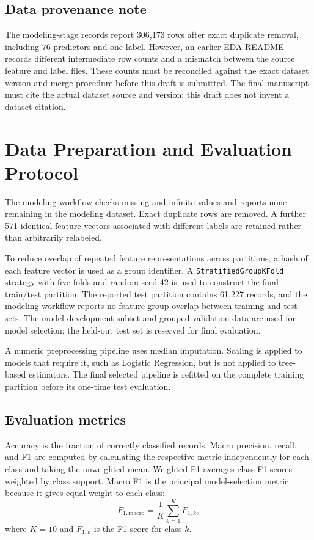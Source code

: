 \documentclass[conference]{IEEEtran}
\begin{document}
\subsection{Data provenance note}
The modeling-stage records report 306,173 rows after exact duplicate removal, including 76 predictors and one label. However, an earlier EDA README records different intermediate row counts and a mismatch between the source feature and label files. These counts must be reconciled against the exact dataset version and merge procedure before this draft is submitted. The final manuscript must cite the actual dataset source and version; this draft does not invent a dataset citation.

\section{Data Preparation and Evaluation Protocol}
The modeling workflow checks missing and infinite values and reports none remaining in the modeling dataset. Exact duplicate rows are removed. A further 571 identical feature vectors associated with different labels are retained rather than arbitrarily relabeled.

To reduce overlap of repeated feature representations across partitions, a hash of each feature vector is used as a group identifier. A \texttt{StratifiedGroupKFold} strategy with five folds and random seed 42 is used to construct the final train/test partition. The reported test partition contains 61,227 records, and the modeling workflow reports no feature-group overlap between training and test sets. The model-development subset and grouped validation data are used for model selection; the held-out test set is reserved for final evaluation.

A numeric preprocessing pipeline uses median imputation. Scaling is applied to models that require it, such as Logistic Regression, but is not applied to tree-based estimators. The final selected pipeline is refitted on the complete training partition before its one-time test evaluation.

\subsection{Evaluation metrics}
Accuracy is the fraction of correctly classified records. Macro precision, recall, and F1 are computed by calculating the respective metric independently for each class and taking the unweighted mean. Weighted F1 averages class F1 scores weighted by class support. Macro F1 is the principal model-selection metric because it gives equal weight to each class:
\begin{equation}
    F_{1,\mathrm{macro}} = \frac{1}{K}\sum_{k=1}^{K} F_{1,k},
\end{equation}
where $K=10$ and $F_{1,k}$ is the F1 score for class $k$.
\end{document}
